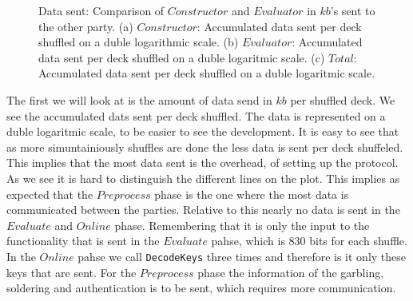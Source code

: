 \documentclass[twoside,11pt,openright]{report}
\begin{document}
\begin{figure}
    \begin{subfigure}{\textwidth}
        \centering
        \caption{}
        \label{fig:total_kb_plot}
    \end{subfigure}

    \caption{Data sent: Comparison of $Constructor$ and $Evaluator$ in $kb$'s sent to the other party. (a) $Constructor$: Accumulated data sent per deck shuffled on a duble logarithmic scale. (b) $Evaluator$: Accumulated data sent per deck shuffled on a duble logaritmic scale. (c) $Total$: Accumulated data sent per deck shuffled on a duble logaritmic scale.}
    \label{fig:mesurement_kb}
\end{figure}

The first we will look at is the amount of data send in $kb$ per shuffled deck. We see the accumulated dats sent per deck shuffled. The data is represented on a duble logaritmic scale, to be easier to see the development. It is easy to see that as more simuntainiously shuffles are done the less data is sent per deck shuffeled. This implies that the most data sent is the overhead, of setting up the protocol. As we see it is hard to distinguish the different lines on the plot. This implies as expected that the $Preprocess$ phase is the one where the most data is communicated between the parties. Relative to this nearly no data is sent in the $Evaluate$ and $Online$ phase. Remembering that it is only the input to the functionality that is sent in the $Evaluate$ pahse, which is $830$ bits for each shuffle. In the $Online$ pahse we call \verb|DecodeKeys| three times and therefore is it only these keys that are sent. For the $Preprocess$ phase the information of the garbling, soldering and authentication is to be sent, which requires more communication.
\end{document}
